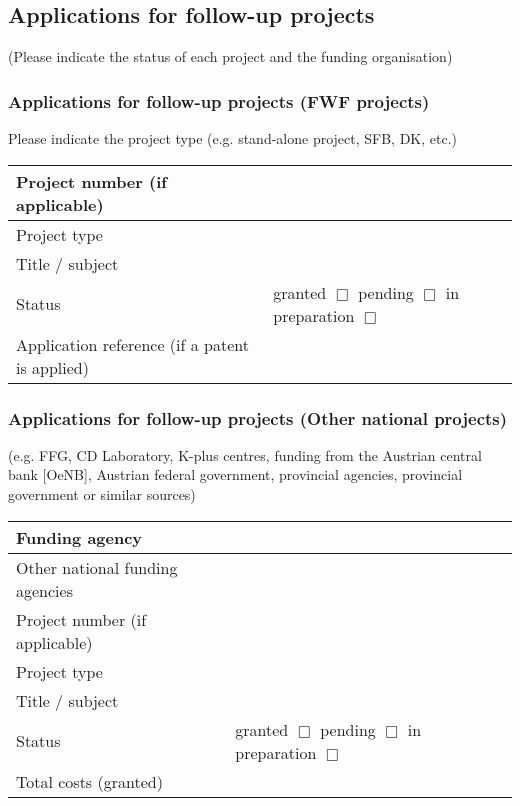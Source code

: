 \documentclass[a4paper, 11pt]{article}
\begin{document}
\subsection{Applications for follow-up projects}

(Please indicate the status of each project and the funding organisation)

\subsubsection{Applications for follow-up projects (FWF projects)}

Please indicate the project type (e.g. stand-alone project, SFB, DK, etc.)

\begin{tabular}{|l|l|}
\hline
Project number (if applicable) & \\
\hline
Project type & \\
\hline
Title / subject & \\
\hline
Status & granted $\Box$ \hspace{0.5cm} pending $\Box$ \hspace{0.5cm} in preparation $\Box$ \\
\hline
Application reference (if a patent is applied) & \\
\hline
\end{tabular}

\subsubsection{Applications for follow-up projects (Other national projects)}

(e.g. FFG, CD Laboratory, K-plus centres, funding from the Austrian central bank
[OeNB], Austrian federal government, provincial agencies, provincial government
or similar sources)

\begin{tabular}{|l|l|}
\hline
Funding agency & 
\\
\hline
Other national funding agencies & \\
\hline
Project number (if applicable) & \\
\hline
Project type & \\
\hline
Title / subject & \\
\hline
Status & granted $\Box$ \hspace{1.5cm} pending $\Box$ \hspace{1.5cm} in preparation $\Box$ \\
\hline
Total costs (granted) & \\
\hline
\end{tabular}
\end{document}
